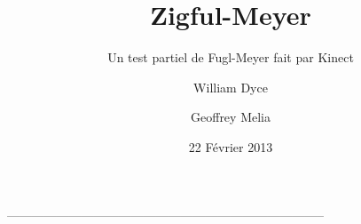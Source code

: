 \documentclass{beamer}
\title{Zigful-Meyer}
\subtitle{Un test partiel de Fugl-Meyer fait par Kinect}
\author{William Dyce \and Geoffrey Melia}
\institute
{
  Université Montpellier 2
}
\date{22 Février 2013}
\begin{document}
\begin{frame}[plain]
  \titlepage
\end{frame}
-----------------------------------------------------------------------------



\begin{frame}
\tableofcontents[hideallsubsections]
\end{frame}















\end{document}
